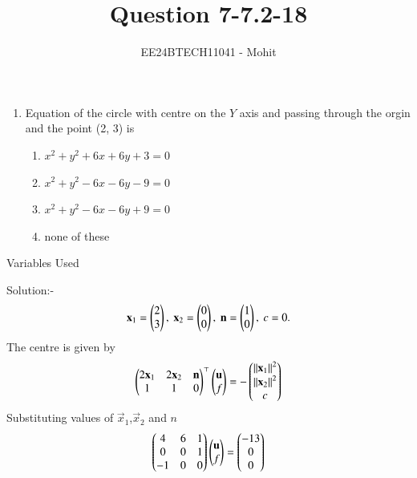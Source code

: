 \documentclass[journal]{IEEEtran}
\numberwithin{equation}{enumi}
\numberwithin{figure}{enumi}
\begin{document}

\title{Question 7-7.2-18}
\author{EE24BTECH11041 - Mohit}
{\let\newpage\relax\maketitle}
\begin{enumerate}
	\item Equation of the circle with centre on the $Y$ axis and passing through the orgin and the point (2, 3) is
\begin{enumerate}
\item $x^2+y^2+6x+6y+3=0$ 
\item $x^2+y^2-6x-6y-9=0$
\item $x^2+y^2-6x-6y+9=0$
\item none of these
\end{enumerate}
\end{enumerate}
\begin{table}[h!]    
  \centering
  
  \caption{Variables Used}
  \label{tab 1.4.9.2}
\end{table}
Solution:-\\
\begin{align}
	\mathbf{x}_{1} = \begin{pmatrix}2\\3\end{pmatrix},\ \mathbf{x}_{2} = \begin{pmatrix}0\\0\end{pmatrix},\
	\mathbf{n} = \begin{pmatrix}1 \\ 0\end{pmatrix},\  c= 0.
\end{align}
The centre is given by
\begin{align}
\begin{pmatrix}
 2 \mathbf{x}_1 & 2 \mathbf{x}_2 & \mathbf{n}
 \\
 1 & 1 & 0
 \end{pmatrix}^\top 
	\begin{pmatrix}\mathbf{u} \\ f\end{pmatrix}
	=
-\begin{pmatrix} 	\left\lVert\mathbf{x}_1\right\rVert^2 
\\
 	\left\lVert\mathbf{x}_2\right\rVert^2 	
	\\
	c     
	\end{pmatrix}
\end{align}
Substituting values of $\vec{x}_1$,$\vec{x}_2$ and $n$
\begin{align}
	\begin{pmatrix}
	        4 & 6 & 1\\
	        0 & 0 & 1\\
-1 & 0 & 0\end{pmatrix}
	\begin{pmatrix}\mathbf{u}\\f\end{pmatrix} = 
	\begin{pmatrix}-13 \\ 0 \\ 0\end{pmatrix}
\end{align}
\end{document}
